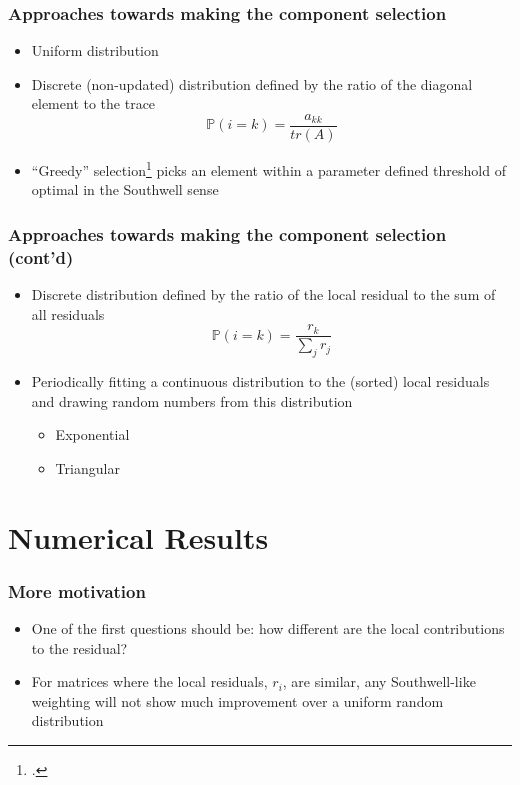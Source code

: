 \documentclass{beamer}
\begin{document}
\begin{frame}
	\frametitle{Approaches towards making the component selection}
	    \begin{itemize}
	        \item Uniform distribution
	        \item Discrete (non-updated) distribution defined by the ratio of the diagonal element to the trace
	            \begin{equation}
	                \mathbb{P}(i=k) = \frac{a_{kk}}{tr(A)}
	            \end{equation}
	        \item ``Greedy'' selection\footcite{griebel2012greedy} picks an element within a parameter defined threshold of optimal in the Southwell sense 
	    \end{itemize}
\end{frame}

\begin{frame}
	\frametitle{Approaches towards making the component selection (cont'd)}
	    \begin{itemize}
	        \item Discrete distribution defined by the ratio of the local residual to the sum of all residuals
	            \begin{equation}
	                \mathbb{P}(i=k) = \frac{r_{k}}{\sum_j r_j}
	            \end{equation}
	        \item Periodically fitting a continuous distribution to the (sorted) local residuals and drawing random numbers from this distribution
	            \begin{itemize}
	                \item Exponential
	                \item Triangular
	            \end{itemize}
	    \end{itemize}
\end{frame}

\section{Numerical Results}

\begin{frame}
	\frametitle{More motivation}
	\begin{itemize}
		\item One of the first questions should be: how different are the local contributions to the residual?
		\item For matrices where the local residuals, $r_i$, are similar, any Southwell-like weighting will not show much improvement over a uniform random distribution
	\end{itemize}
\end{frame}
\end{document}
